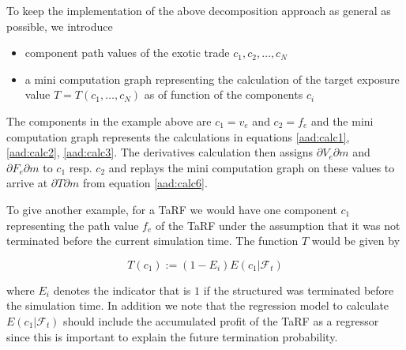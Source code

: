 To keep the implementation of the above decomposition approach as general as possible, we introduce

\begin{itemize}
\item component path values of the exotic trade $c_1, c_2, \ldots, c_N$
\item a mini computation graph representing the calculation of the target exposure value $T = T(c_1,\ldots,c_N)$ as of
  function of the components $c_i$
\end{itemize}

The components in the example above are $c_1 = v_e$ and $c_2 = f_e$ and the mini computation graph represents the
calculations in equations \ref{aad:calc1}, \ref{aad:calc2}, \ref{aad:calc3}. The derivatives calculation then assigns
$\partial V_e \partial m$ and $\partial F_e\partial m$ to $c_1$ resp. $c_2$ and replays the mini
computation graph on these values to arrive at $\partial T\partial m$ from equation \ref{aad:calc6}.

To give another example, for a TaRF we would have one component $c_1$ representing the path value $f_e$ of the TaRF under the
assumption that it was not terminated before the current simulation time. The function $T$ would be given by

$$
T(c_1) := (1-E_i) E( c_1 | \mathcal{F}_t )
$$

where $E_i$ denotes the indicator that is $1$ if the structured was terminated before the simulation time. In addition
we note that the regression model to calculate $E(c_1|\mathcal{F}_t )$ should include the accumulated profit of the TaRF
as a regressor since this is important to explain the future termination probability.

